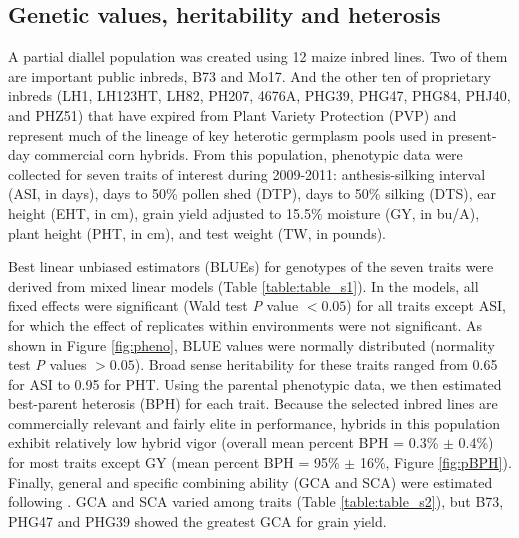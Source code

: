 \documentclass[9pt,twocolumn,twoside]{gsajnl}
\begin{document}

\subsection*{Genetic values, heritability and heterosis}

A partial diallel population was created using 12 maize inbred lines. 
Two of them are important public inbreds, B73 and Mo17. And the other ten of proprietary inbreds (LH1, LH123HT, LH82, PH207, 4676A, PHG39, PHG47, PHG84, PHJ40, and PHZ51) that have expired from Plant Variety Protection (PVP) and represent much of the lineage of key heterotic germplasm pools used in present-day commercial corn hybrids. 
From this population, phenotypic data were collected for seven traits of interest during 2009-2011: anthesis-silking interval (ASI, in days), days to 50\% pollen shed (DTP), days to 50\% silking (DTS), ear height (EHT, in cm), grain yield adjusted to 15.5\% moisture (GY, in bu/A), plant height (PHT, in cm), and test weight (TW, in pounds).

Best linear unbiased estimators (BLUEs) for genotypes of the seven traits were derived from mixed linear models (Table \ref{table:table_s1}).
In the models, all fixed effects were significant (Wald test \emph{P} value $<0.05$) for all traits except ASI, for which the effect of replicates within environments were not significant. 
As shown in Figure \ref{fig:pheno}, BLUE values were normally distributed (normality test \emph{P} values $>0.05$). 
Broad sense heritability for these traits ranged from 0.65 for ASI to 0.95 for PHT. 
Using the parental phenotypic data, we then estimated best-parent heterosis (BPH) for each trait.  
Because the selected inbred lines are commercially relevant and fairly elite in performance, hybrids in this population exhibit relatively low hybrid vigor (overall mean percent BPH = 0.3\% $\pm$ 0.4\%) for most traits except GY (mean percent BPH = 95\% $\pm$ 16\%, Figure \ref{fig:pBPH}). 
Finally, general and specific combining ability (GCA and SCA) were estimated following \citep{Falconer1996}. 
GCA and SCA varied among traits (Table \ref{table:table_s2}), but B73, PHG47 and PHG39 showed the greatest GCA for grain yield.
\end{document}
